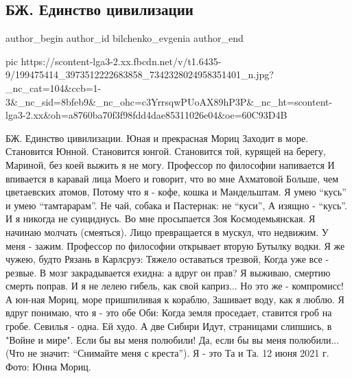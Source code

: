  
 
 
 
 
 
\subsection{БЖ. Единство цивилизации}
\label{sec:12_06_2021.fb.bilchenko_evgenia.7.civilizacia_jedinstvo}
\ifcmt
 author_begin
   author_id bilchenko_evgenia
 author_end
\fi

\ifcmt
  pic https://scontent-lga3-2.xx.fbcdn.net/v/t1.6435-9/199475414_3973512222683858_7342328024958351401_n.jpg?_nc_cat=104&ccb=1-3&_nc_sid=8bfeb9&_nc_ohc=c3YrrsqwPUoAX89hP3P&_nc_ht=scontent-lga3-2.xx&oh=a8760ba70f3f98fdd4dae85311026e04&oe=60C93D4B
\fi

БЖ. Единство цивилизации.
Юная и прекрасная Мориц
Заходит в море.
Становится Юнной.
Становится юнгой.
Становится той, курящей на берегу,
Мариной, без коей выжить я не могу.
Профессор по философии напивается
И впивается в каравай лица
Моего и говорит, что во мне Ахматовой
Больше, чем цветаевских атомов,
Потому что я - кофе, кошка и Мандельштам.
Я умею \enquote{кусь} и умею \enquote{тамтарарам}.
Не чай, собака и Пастернак: не \enquote{куси}, 
А изящно - \enquote{кусь}.
И я никогда не суициднусь.
Во мне просыпается Зоя Космодемьянская.
Я начинаю молчать (смеяться).
Лицо превращается в мускул, что недвижим.
У меня - зажим. 
Профессор по философии открывает вторую
Бутылку водки. Я же чужею, будто Рязань в Карлсруэ:
Тяжело оставаться трезвой,
Когда уже все - резвые.
В мозг закрадывается ехидна: а вдруг он прав?
Я выживаю, смертию смерть поправ.
И я не лелею гибель, как свой каприз...
Но это же - компромисс!
А юн-ная Мориц, море пришпиливая к кораблю,
Зашивает воду, как я люблю.
Я вдруг понимаю, что я - это обе 
Оби:
Когда земля проседает, ставится гроб на гробе.
Севилья - одна. Ей худо. А две Сибири
Идут, страницами слипшись, в "Войне и мире".
Если бы вы меня полюбили!
Да, если бы вы меня полюбили...
(Что не значит: \enquote{Снимайте меня с креста}).
Я - это Та и Та. 
12 июня 2021 г.
Фото: Юнна Мориц.
